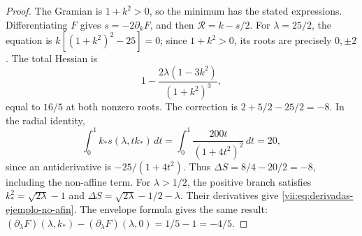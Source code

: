 \begin{proof}
The Gramian is \(1+k^2>0\), so the minimum has the
stated expressions. Differentiating \(F\) gives
\(s=-2\partial_kF\), and then \(\mathcal R=k-s/2\).
For \(\lambda=25/2\), the equation is
\(k[(1+k^2)^2-25]=0\); since \(1+k^2>0\), its roots
are precisely \(0,\pm2\). The total Hessian is
\[
 1-\frac{2\lambda(1-3k^2)}{(1+k^2)^3},
\]
equal to \(16/5\) at both nonzero roots. The correction is
\(2+5/2-25/2=-8\). In the radial identity,
\[
 \int_0^1 k_*s(\lambda,tk_*)\,dt
    =\int_0^1\frac{200t}{(1+4t^2)^2}\,dt=20,
\]
since an antiderivative is \(-25/(1+4t^2)\).
Thus \(\Delta S=8/4-20/2=-8\), including the non-affine term.
For \(\lambda>1/2\), the positive branch satisfies
\(k_*^2=\sqrt{2\lambda}-1\) and
\(\Delta S=\sqrt{2\lambda}-1/2-\lambda\).
Their derivatives give \eqref{vii:eq:derivadas-ejemplo-no-afin}.
The envelope formula gives the same result:
\((\partial_\lambda F)(\lambda,k_*)
 -(\partial_\lambda F)(\lambda,0)=1/5-1=-4/5\).
\end{proof}
